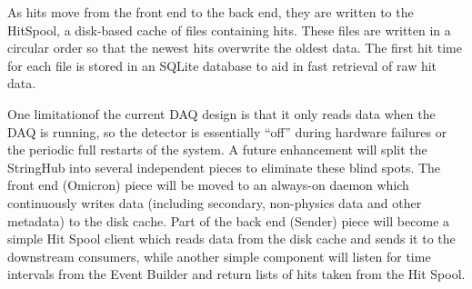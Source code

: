 



As hits move from the front end to the back end, they are written to the
HitSpool, a disk-based cache of files containing hits.  These files are
written in a circular order so that the newest hits overwrite the oldest data.
The first hit time for each file is stored in an SQLite database to aid in fast
retrieval of raw hit data.

One limitationof the current DAQ design is that it only reads data when the
DAQ is running, so the detector is essentially ``off'' during hardware failures
or the periodic full restarts of the system.  A future enhancement will split
the StringHub into several independent pieces to eliminate these blind spots.
The front end (Omicron) piece will be moved to an always-on daemon which
continuously writes data (including secondary, non-physics data and other
metadata) to the disk cache.  Part of the back end (Sender) piece will become a
simple Hit Spool client which reads data from the disk cache and sends it to
the downstream consumers, while another simple component will listen for time
intervals from the Event Builder and return lists of hits taken from the
Hit Spool.

